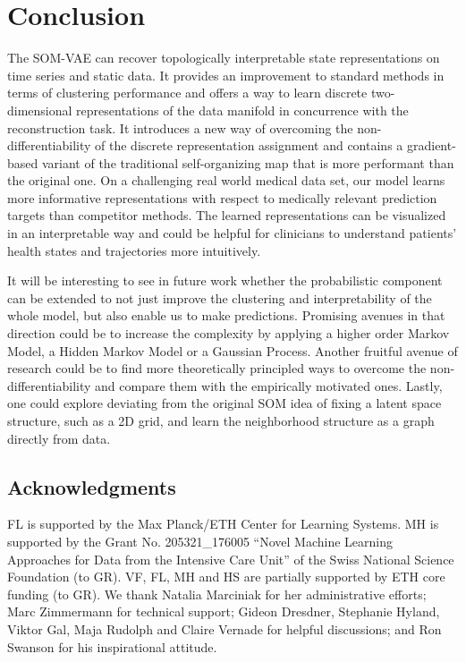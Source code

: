 \FloatBarrier

\section{Conclusion}

The SOM-VAE can recover topologically interpretable state representations on time series and static data.
It provides an improvement to standard methods in terms of clustering performance and offers a way to learn discrete two-dimensional representations of the data manifold in concurrence with the reconstruction task.
It introduces a new way of overcoming the non-differentiability of the discrete representation assignment and contains a gradient-based variant of the traditional self-organizing map that is more performant than the original one.
On a challenging real world medical data set, our model learns more informative representations with respect to medically relevant prediction targets than competitor methods.
The learned representations can be visualized in an interpretable way and could be helpful for clinicians to understand patients' health states and trajectories more intuitively.

It will be interesting to see in future work whether the probabilistic component can be extended to not just improve the clustering and interpretability of the whole model, but also enable us to make predictions.
Promising avenues in that direction could be to increase the complexity by applying a higher order Markov Model, a Hidden Markov Model or a Gaussian Process.
Another fruitful avenue of research could be to find more theoretically principled ways to overcome the non-differentiability and compare them with the empirically motivated ones.
Lastly, one could explore deviating from the original SOM idea of fixing a latent space structure, such as a 2D grid, and learn the neighborhood structure as a graph directly from data.


\subsection*{Acknowledgments}

FL is supported by the Max Planck/ETH Center for Learning Systems.
MH is supported by the Grant No. 205321\_176005 ``Novel Machine Learning Approaches for Data from the Intensive Care
Unit'' of the Swiss National Science Foundation (to GR).
VF, FL, MH and HS are partially supported by ETH core funding (to GR).
We thank Natalia Marciniak for her administrative efforts; Marc Zimmermann for technical support; Gideon Dresdner, Stephanie Hyland, Viktor Gal, Maja Rudolph and Claire Vernade for helpful discussions; and Ron Swanson for his inspirational attitude.